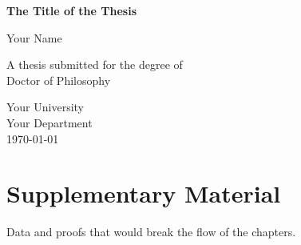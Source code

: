 \documentclass[11pt,a4paper,twoside,openright]{report}
\begin{document}
\begin{titlepage}
  \centering
  \vspace*{3cm}
  {\Huge\bfseries The Title of the Thesis\par}
  \vspace{1.5cm}
  {\Large Your Name\par}
  \vspace{1cm}
  A thesis submitted for the degree of\\ Doctor of Philosophy\par
  \vfill
  Your University\\ Your Department\\[0.5cm]
  \today
\end{titlepage}

\begin{abstract}
The thesis in one page: the question, the approach, the contributions.
\end{abstract}

\tableofcontents




\appendix
\chapter{Supplementary Material}
Data and proofs that would break the flow of the chapters.
\end{document}
